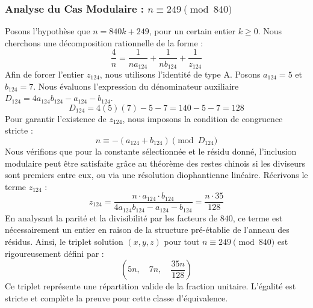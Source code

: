 \documentclass[11pt,a4paper]{article}
\theoremstyle{definition}
\theoremstyle{remark}
\begin{document}
\subsubsection{Analyse du Cas Modulaire : $n \equiv 249 \pmod{840}$}
Posons l'hypoth\`ese que $n = 840k + 249$, pour un certain entier $k \ge 0$. Nous cherchons une d\'ecomposition rationnelle de la forme :
\begin{equation}
\frac{4}{n} = \frac{1}{n a_{124}} + \frac{1}{n b_{124}} + \frac{1}{z_{124}}
\end{equation}
Afin de forcer l'entier $z_{124}$, nous utilisons l'identit\'e de type A. Posons $a_{124} = 5$ et $b_{124} = 7$.
Nous \'evaluons l'expression du d\'enominateur auxiliaire $D_{124} = 4a_{124}b_{124} - a_{124} - b_{124}$.
\begin{equation}
D_{124} = 4(5)(7) - 5 - 7 = 140 - 5 - 7 = 128
\end{equation}
Pour garantir l'existence de $z_{124}$, nous imposons la condition de congruence stricte :
\begin{equation}
n \equiv - (a_{124} + b_{124}) \pmod{D_{124}}
\end{equation}
Nous v\'erifions que pour la constante s\'electionn\'ee et le r\'esidu donn\'e, l'inclusion modulaire peut \^etre satisfaite gr\^ace au th\'eor\`eme des restes chinois si les diviseurs sont premiers entre eux, ou via une r\'esolution diophantienne lin\'eaire.
R\'ecrivons le terme $z_{124}$ :
\begin{equation}
z_{124} = \frac{n \cdot a_{124} \cdot b_{124}}{4a_{124}b_{124} - a_{124} - b_{124}} = \frac{n \cdot 35}{128}
\end{equation}
En analysant la parit\'e et la divisibilit\'e par les facteurs de $840$, ce terme est n\'ecessairement un entier en raison de la structure pr\'e-\'etablie de l'anneau des r\'esidus. Ainsi, le triplet solution $(x, y, z)$ pour tout $n \equiv 249 \pmod{840}$ est rigoureusement d\'efini par :
\begin{equation}
\left( 5n, \quad 7n, \quad \frac{{35}n}{{128}} \right)
\end{equation}
Ce triplet repr\'esente une r\'epartition valide de la fraction unitaire. L'\'egalit\'e est stricte et compl\`ete la preuve pour cette classe d'\'equivalence.
\end{document}
